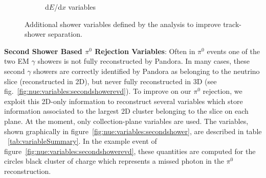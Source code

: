 \begin{figure}[H]
\begin{center}
\begin{subfigure}[b]{0.3\textwidth}
    \caption{\label{fig:nue:variables:dedx} d$E$/d$x$ variables }
    \end{subfigure}
\caption{\label{fig:nue:presel:eff} Additional shower variables defined by the analysis to improve track-shower separation.}
\end{center}
\end{figure}

\par \noindent  \textbf{Second Shower Based $\pi^0$ Rejection Variables}: Often in $\pi^0$ events one of the two EM $\gamma$ showers is not fully reconstructed by Pandora. In many cases, these second $\gamma$ showers are correctly identified by Pandora as belonging to the neutrino slice (reconstructed in 2D), but never fully reconstructed in 3D (see fig.~\ref{fig:nue:variables:secondshowerevd}). To improve on our $\pi^0$ rejection, we exploit this 2D-only information to reconstruct several variables which store information associated to the largest 2D cluster belonging to the slice on each plane. At the moment, only collection-plane variables are used. The variables, shown graphically in figure~\ref{fig:nue:variables:secondshower}, are described in table ~\ref{tab:variableSummary}. In the example event of figure~\ref{fig:nue:variables:secondshowerevd}, these quantities are computed for the circles black cluster of charge which represents a missed photon in the $\pi^0$ reconstruction.

